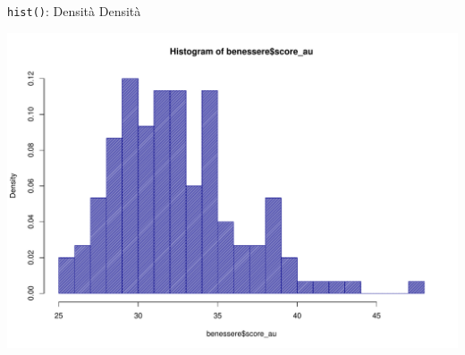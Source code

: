 \documentclass[
  ignorenonframetext,
]{beamer}
\newenvironment{Shaded}{\begin{snugshade}}{\end{snugshade}}
\newcommand{\AttributeTok}[1]{\textcolor[rgb]{0.00,0.34,0.68}{#1}}
\newcommand{\ConstantTok}[1]{\textcolor[rgb]{0.67,0.33,0.00}{#1}}
\newcommand{\DecValTok}[1]{\textcolor[rgb]{0.69,0.50,0.00}{#1}}
\newcommand{\FunctionTok}[1]{\textcolor[rgb]{0.39,0.29,0.61}{#1}}
\newcommand{\NormalTok}[1]{\textcolor[rgb]{0.12,0.11,0.11}{#1}}
\newcommand{\SpecialCharTok}[1]{\textcolor[rgb]{0.24,0.68,0.91}{#1}}
\newcommand{\StringTok}[1]{\textcolor[rgb]{0.75,0.01,0.01}{#1}}
\begin{document}
\begin{frame}[fragile]{\texttt{hist()}: Densità}
\protect\hypertarget{hist-densituxe0}{}
Densità \scriptsize

\begin{Shaded}
\end{Shaded}

\begin{center}\includegraphics[width=0.7\linewidth]{Practice_files/figure-beamer/unnamed-chunk-45-1} \end{center}
\end{frame}
\end{document}
